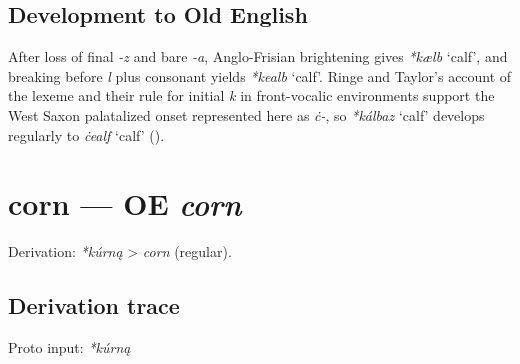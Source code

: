 \documentclass[
  british,
  a4paper,
  openany]{book}
\providecommand{\Recon}[1]{\emph{*#1}}
{\catcode`→=\active \global\def→{\ensuremath{\rightarrow}}}
\providecommand{\texorpdfstring}[2]{#1}
\providecommand{\Recon}[1]{\emph{*#1}}
{\catcode`→=\active \global\def→{\ensuremath{\rightarrow}}}
\begin{document}
\subsection{Development to Old
English}\label{development-to-old-english-10}

After loss of final \emph{-z} and bare \emph{-a}, Anglo-Frisian
brightening gives \Recon{kælb} `calf', and breaking before \emph{l} plus
consonant yields \Recon{kealb} `calf'. Ringe and Taylor's account of the
lexeme and their rule for initial \emph{k} in front-vocalic environments
support the West Saxon palatalized onset represented here as \emph{ċ-},
so \Recon{kálbaz} `calf' develops regularly to \emph{ċealf} `calf'
().

\section{\texorpdfstring{corn --- OE
\emph{corn}}{corn --- OE corn}}\label{corn-oe-corn}


Derivation: \emph{*kúrną} \textgreater{} \emph{corn} (regular).

\subsection{Derivation trace}\label{derivation-trace-11}

Proto input: \emph{*kúrną}

\begingroup
\setlength{\fboxsep}{6pt}
\end{document}

